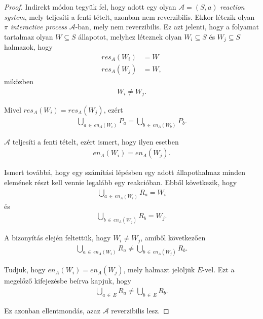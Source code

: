 \documentclass[12pt]{article}
\theoremstyle{definition}
\theoremstyle{remark}
\theoremstyle{plain}
\newcommand{\en}{\textit{en}}
\newcommand{\res}{\textit{res}}
\begin{document}
    \begin{proof}
        Indirekt módon tegyük fel, hogy adott egy olyan $\mathscr{A}=(S, a)$ \textit{reaction system}, mely teljesíti a fenti tételt, azonban nem reverzibilis. Ekkor létezik olyan $\pi$ \textit{interactive process} $\mathscr{A}$-ban, mely nem reverzibilis. Ez azt jelenti, hogy a folyamat tartalmaz olyan $W \subseteq S$ állapotot, melyhez léteznek olyan $W_{i} \subseteq S$ és $W_{j} \subseteq S$ halmazok, hogy
        \begin{align*}
            \res_{A}(W_{i}) &= W \\
            \res_{A}(W_{j}) &= W,
        \end{align*}
        miközben
        \begin{align*}
            W_{i} \neq W_{j}.
        \end{align*}

        Mivel $\res_{A}(W_{i}) = \res_{A}(W_{j})$, ezért
        \begin{align*}
            \bigcup\limits_{a \,\in\, \en_{A}(W_{i})}P_{a} = \bigcup\limits_{b \,\in\, \en_{A}(W_{b})}P_{b}.
        \end{align*}

        $\mathscr{A}$ teljesíti a fenti tételt, ezért ismert, hogy ilyen esetben
        \begin{align*}
            \en_{A}(W_{i}) = \en_{A}(W_{j}).
        \end{align*}

        Ismert továbbá, hogy egy számítási lépésben egy adott állapothalmaz minden elemének részt kell vennie legalább egy reakcióban. Ebből következik, hogy
        \begin{align*}
            \bigcup\limits_{a \,\in\, \en_{A}(W_{i})} R_{a} = W_{i}
        \end{align*}
        és
        \begin{align*}
            \bigcup\limits_{b \,\in\, \en_{A}(W_{j})} R_{b} = W_{j}.
        \end{align*}

        A bizonyítás elején feltettük, hogy $W_{i} \neq W_{j}$, amiből következően
        \begin{align*}
            \bigcup\limits_{a \,\in\, \en_{A}(W_{i})} R_{a} \neq \bigcup\limits_{b \,\in\, \en_{A}(W_{j})} R_{b}.
        \end{align*}

        Tudjuk, hogy $\en_{A}(W_{i}) = \en_{A}(W_{j})$, mely halmazt jelöljük $E$-vel. Ezt a megelőző kifejezésbe beírva kapjuk, hogy
        \begin{align*}
            \bigcup\limits_{a \,\in\, E} R_{a} \neq \bigcup\limits_{b \,\in\, E} R_{b}.
        \end{align*}
        
        Ez azonban ellentmondás, azaz $\mathscr{A}$ reverzibilis lesz.
    \end{proof}
\end{document}
